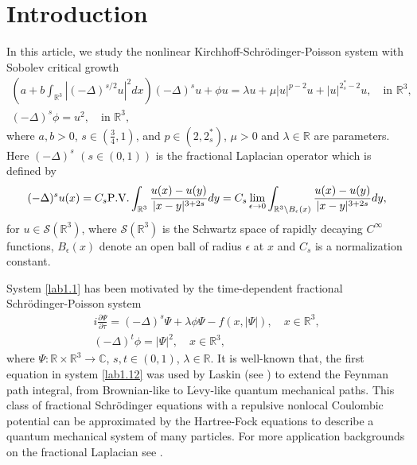 \documentclass[reqno]{amsart}
\begin{document}
\section{Introduction}

In this article, we study the nonlinear Kirchhoff-Schr\"odinger-Poisson system
with Sobolev critical growth
\begin{equation}\label{lab1.1}
\begin{gathered}
(a+b\int_{\mathbb{R}^3}|(-\Delta)^{s/2}u|^2dx)(-\Delta)^s u+ \phi u
= \lambda u+\mu|u|^{p-2}u+|u|^{{2^*_s}-2}u,  \quad \text{in }\mathbb{R}^3, \\
(-\Delta)^s \phi=u^2, \quad   \text{in }\mathbb{R}^3,
\end{gathered}
\end{equation}
where $a,b>0$, $s\in(\frac{3}{4},1)$, and  $p \in(2,2^*_s)$,  $\mu>0$ and
$\lambda \in \mathbb{R}$ are parameters.
Here $(-\Delta)^s$ $(s\in(0,1))$ is the fractional Laplacian operator which is
defined by
$$
(-\Delta)^s u(x)=C_s {\rm P.V.}\int_{\mathbb{R}^3}\frac{u(x)-u(y)}{|x-y|^{3+2s}}dy
=C_s\lim_{\epsilon\to 0}\int_{{\mathbb{R}^3}
\setminus B_\epsilon(x)}\frac{u(x)-u(y)}{|x-y|^{3+2s}}dy,
$$
for $u\in \mathcal{S}(\mathbb{R}^3)$, where $\mathcal{S}(\mathbb{R}^3) $ is the
Schwartz space  of rapidly decaying $C^\infty$ functions, $B_\epsilon(x)$ denote an
open ball of radius $\epsilon$ at $x$ and $C_s$ is a normalization constant.

System \eqref{lab1.1} has been motivated by the
time-dependent fractional Schr\"odinger-Poisson system
\begin{equation}\label{lab1.12}
\begin{gathered}
i\frac{\partial \Psi}{\partial \tau } =(-\Delta)^s\Psi +\lambda\phi\Psi-f(x,|\Psi|),
\quad  x\in \mathbb{R}^3,\\
(-\Delta)^t\phi=|\Psi|^2, \quad  x\in \mathbb{R}^3,
\end{gathered}
\end{equation}
where $\Psi: {\mathbb{R}\times \mathbb{R}^3}\to \mathbb{C}$, $s,t \in(0,1)$,
$\lambda \in \mathbb{R}$. It is well-known that, the first equation in
system \eqref{lab1.12} was used by Laskin (see \cite{L2998, L3998}) to extend the Feynman path integral, from Brownian-like to L$\mathrm {\acute{e}}$vy-like quantum mechanical paths. This class of fractional Schr\"odinger equations with a repulsive nonlocal Coulombic potential can be approximated by the Hartree-Fock equations to describe a quantum mechanical system of many particles. For more application backgrounds on the fractional Laplacian see \cite{C4998, D7998, M6998}.
\end{document}
